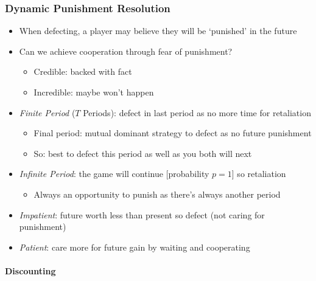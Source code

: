 \documentclass[11pt, english]{article}
\begin{document}
		\subsubsection{Dynamic Punishment Resolution}

	\begin{itemize}                                         
        \setlength\itemsep{0cm}
		\item When defecting, a player may believe they will be ‘punished’ in the future
		\item Can we achieve cooperation through fear of punishment?
		\begin{itemize}
			\item Credible: backed with fact
			\item Incredible: maybe won’t happen 
		\end{itemize}
		\item \textit{Finite Period} ($T$ Periods): defect in last period as no more time for retaliation
		\begin{itemize}
			\item Final period: mutual dominant strategy to defect as no future punishment 
			\item So: best to defect this period as well as you both will next
		\end{itemize}
		\item \textit{Infinite Period}: the game will continue [probability $p=1$] so retaliation 
		\begin{itemize}
			\item Always an opportunity to punish as there’s always another period
		\end{itemize}
		\item \textit{Impatient}: future worth less than present so defect (not caring for punishment)
		\item \textit{Patient}: care more for future gain by waiting and cooperating
	\end{itemize}
		
		\paragraph{Discounting}
\end{document}
